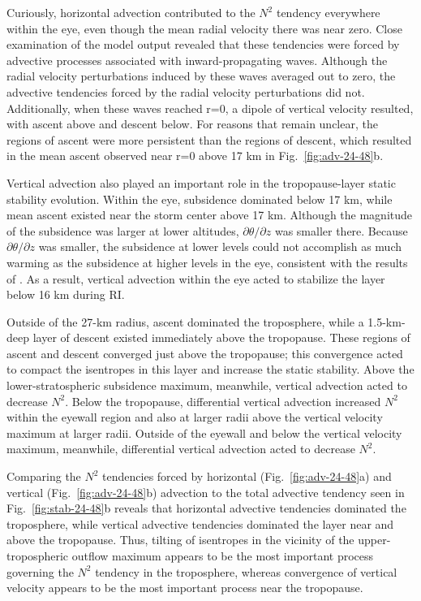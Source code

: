 \documentclass{ametsoc}
\begin{document}
Curiously, horizontal advection contributed to the $N^2$ tendency everywhere within the eye, even though the mean radial velocity there was near zero.
Close examination of the model output revealed that these tendencies were forced by advective processes associated with inward-propagating waves.
Although the radial velocity perturbations induced by these waves averaged out to zero, the advective tendencies forced by the radial velocity perturbations did not.
Additionally, when these waves reached r=0, a dipole of vertical velocity resulted, with ascent above and descent below.
For reasons that remain unclear, the regions of ascent were more persistent than the regions of descent, which resulted in the mean ascent observed near r=0 above 17 km in Fig.~\ref{fig:adv-24-48}b.

Vertical advection also played an important role in the tropopause-layer static stability evolution.
Within the eye, subsidence dominated below 17 km, while mean ascent existed near the storm center above 17 km.
Although the magnitude of the subsidence was larger at lower altitudes, $\partial \theta/\partial z$ was smaller there.
Because $\partial \theta/\partial z$ was smaller, the subsidence at lower levels could not accomplish as much warming as the subsidence at higher levels in the eye, consistent with the results of \cite{SternZhang2013}.
As a result, vertical advection within the eye acted to stabilize the layer below 16 km during RI.

Outside of the 27-km radius, ascent dominated the troposphere, while a 1.5-km-deep layer of descent existed immediately above the tropopause.
These regions of ascent and descent converged just above the tropopause; this convergence acted to compact the isentropes in this layer and increase the static stability.
Above the lower-stratospheric subsidence maximum, meanwhile, vertical advection acted to decrease $N^2$.
Below the tropopause, differential vertical advection increased $N^2$ within the eyewall region and also at larger radii above the vertical velocity maximum at larger radii.
Outside of the eyewall and below the vertical velocity maximum, meanwhile, differential vertical advection acted to decrease $N^2$.

Comparing the $N^2$ tendencies forced by horizontal (Fig.~\ref{fig:adv-24-48}a) and vertical (Fig.~\ref{fig:adv-24-48}b) advection to the total advective tendency seen in Fig.~\ref{fig:stab-24-48}b reveals that horizontal advective tendencies dominated the troposphere, while vertical advective tendencies dominated the layer near and above the tropopause.
Thus, tilting of isentropes in the vicinity of the upper-tropospheric outflow maximum appears to be the most important process governing the $N^2$ tendency in the troposphere, whereas convergence of vertical velocity appears to be the most important process near the tropopause. 
\end{document}
